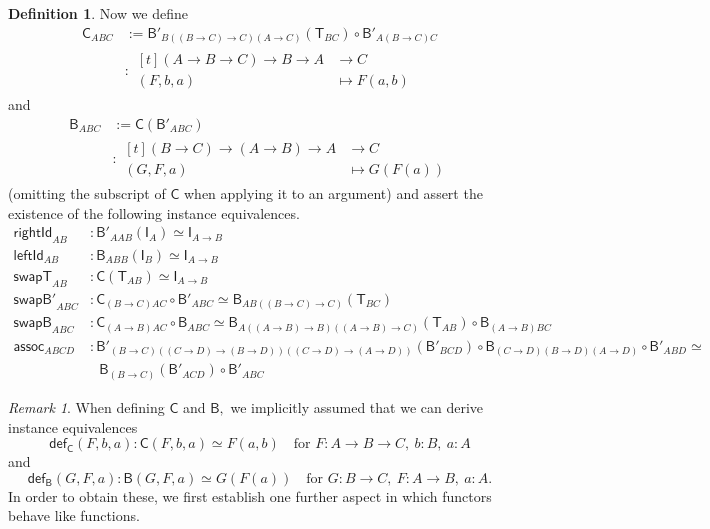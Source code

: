 \documentclass[a4paper]{article}
\theoremstyle{definition}
\newtheorem{definition}{Definition}[section]
\theoremstyle{remark}
\newtheorem*{remark}{Remark}
\renewcommand{\equiv}{\simeq}
\newcommand{\nm}{\mathsf}
\newcommand{\fndef}[1]{\nm{def}_{#1}}
\newcommand{\combinator}{\nm}
\newcommand{\idFun}{\combinator{I}}
\newcommand{\appFun}{\combinator{T}}
\newcommand{\compFun}{\combinator{B'}}
\newcommand{\revCompFun}{\combinator{B}}
\newcommand{\swapFun}{\combinator{C}}
\begin{document}
\begin{definition}
  Now we define
  \begin{align*}
    \swapFun_{ABC} &:= \compFun_{B((B{\to}C){\to}C)(A{\to}C)}(\appFun_{BC}) \circ \compFun_{A(B{\to}C)C}\\
                   &: \begin{aligned}[t]
                        (A \to B \to C) \to B \to A &\to     C\\
                        (F,b,a)                     &\mapsto F(a,b)
                      \end{aligned}
  \end{align*}
  and
  \begin{align*}
    \revCompFun_{ABC} &:= \swapFun(\compFun_{ABC})\\
                      &: \begin{aligned}[t]
                           (B \to C) \to (A \to B) \to A &\to     C\\
                           (G,F,a)                       &\mapsto G(F(a))
                         \end{aligned}
  \end{align*}
  (omitting the subscript of $\swapFun$ when applying it to an argument)
  and assert the existence of the following instance equivalences.
  \begin{align*}
    \nm{rightId}_{AB} &: \compFun_{AAB}(\idFun_A) \equiv \idFun_{A{\to}B}\\
    \nm{leftId}_{AB}  &: \revCompFun_{ABB}(\idFun_B) \equiv \idFun_{A{\to}B}\\
    \nm{swapT}_{AB}   &: \swapFun(\appFun_{AB}) \equiv \idFun_{A{\to}B}\\
    \nm{swapB'}_{ABC} &: \swapFun_{(B{\to}C)AC} \circ \compFun_{ABC} \equiv \revCompFun_{AB((B{\to}C){\to}C)}(\appFun_{BC})\\
    \nm{swapB}_{ABC}  &: \swapFun_{(A{\to}B)AC} \circ \revCompFun_{ABC} \equiv \revCompFun_{A((A{\to}B){\to}B)((A{\to}B){\to}C)}(\appFun_{AB}) \circ \revCompFun_{(A{\to}B)BC}\\
    \nm{assoc}_{ABCD} &: \compFun_{(B{\to}C)((C{\to}D){\to}(B{\to}D))((C{\to}D){\to}(A{\to}D))}(\compFun_{BCD}) \circ \revCompFun_{(C{\to}D)(B{\to}D)(A{\to}D)} \circ \compFun_{ABD} \equiv\\
                      &\:\ \ \revCompFun_{(B{\to}C)}(\compFun_{ACD}) \circ \compFun_{ABC}
  \end{align*}
\end{definition}

\begin{remark}
  When defining $\swapFun$ and $\revCompFun,$ we implicitly assumed that we can derive
  instance equivalences
  \[\fndef{\swapFun}(F,b,a) : \swapFun(F,b,a) \equiv F(a,b) \quad \text{for } F : A \to B \to C,\ b : B,\ a : A\]
  and
  \[\fndef{\revCompFun}(G,F,a) : \revCompFun(G,F,a) \equiv G(F(a)) \quad \text{for } G : B \to C,\ F : A \to B,\ a : A.\]
  In order to obtain these, we first establish one further aspect in which functors behave like
  functions.
\end{remark}
\end{document}
